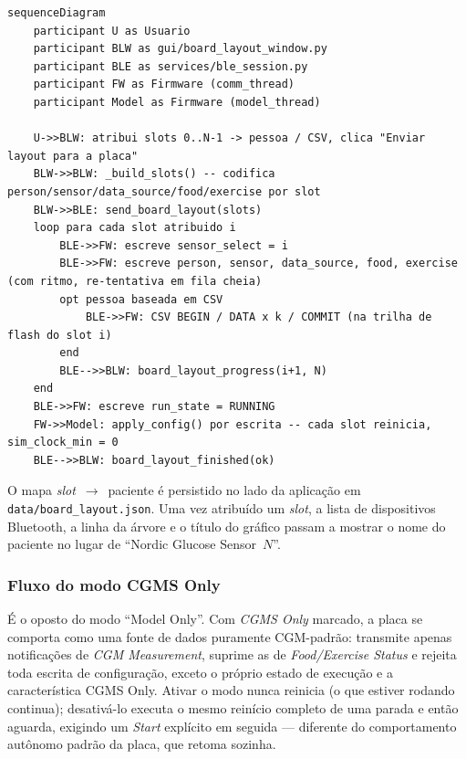 \begin{lstlisting}[language=mermaid,caption={Fluxo de envio de layout multi-sensor: um slot por vez, sobre uma única conexão.},label={lst:fluxo-layout}]
sequenceDiagram
    participant U as Usuario
    participant BLW as gui/board_layout_window.py
    participant BLE as services/ble_session.py
    participant FW as Firmware (comm_thread)
    participant Model as Firmware (model_thread)

    U->>BLW: atribui slots 0..N-1 -> pessoa / CSV, clica "Enviar layout para a placa"
    BLW->>BLW: _build_slots() -- codifica person/sensor/data_source/food/exercise por slot
    BLW->>BLE: send_board_layout(slots)
    loop para cada slot atribuido i
        BLE->>FW: escreve sensor_select = i
        BLE->>FW: escreve person, sensor, data_source, food, exercise (com ritmo, re-tentativa em fila cheia)
        opt pessoa baseada em CSV
            BLE->>FW: CSV BEGIN / DATA x k / COMMIT (na trilha de flash do slot i)
        end
        BLE-->>BLW: board_layout_progress(i+1, N)
    end
    BLE->>FW: escreve run_state = RUNNING
    FW->>Model: apply_config() por escrita -- cada slot reinicia, sim_clock_min = 0
    BLE-->>BLW: board_layout_finished(ok)
\end{lstlisting}

O mapa \textit{slot}~$\rightarrow$~paciente é persistido no lado da aplicação
em \texttt{data/board\_layout.json}. Uma vez atribuído um \textit{slot}, a
lista de dispositivos Bluetooth, a linha da árvore e o título do gráfico
passam a mostrar o nome do paciente no lugar de ``Nordic Glucose Sensor~$N$''.

\subsubsection{Fluxo do modo CGMS Only}
\label{sec:fluxo-cgms-only}

É o oposto do modo ``Model Only''. Com \emph{CGMS Only} marcado, a placa se
comporta como uma fonte de dados puramente CGM-padrão: transmite apenas
notificações de \textit{CGM Measurement}, suprime as de \textit{Food/Exercise
Status} e rejeita toda escrita de configuração, exceto o próprio estado de
execução e a característica CGMS Only. Ativar o modo nunca reinicia (o que
estiver rodando continua); desativá-lo executa o mesmo reinício completo de
uma parada e então aguarda, exigindo um \emph{Start} explícito em seguida ---
diferente do comportamento autônomo padrão da placa, que retoma sozinha.

